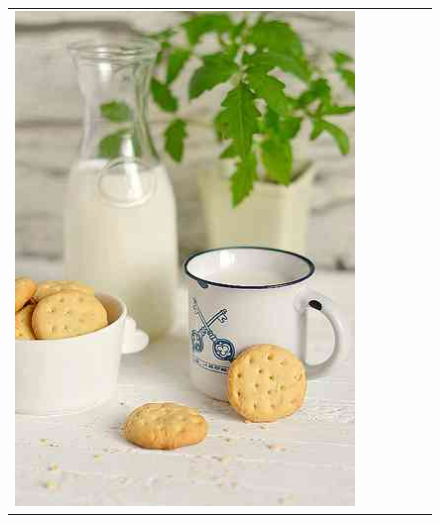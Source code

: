 \begin{figure}
\begin{tabular}{m{.01\linewidth} m{.16\linewidth} m{.16\linewidth} m{.16\linewidth} m{.16\linewidth} m{.16\linewidth}}
    \includegraphics[width=\linewidth]{../style/figures/flickr_on_flickr/pred_style_Pastel/3.jpg} &

\end{tabular}
\end{figure}
